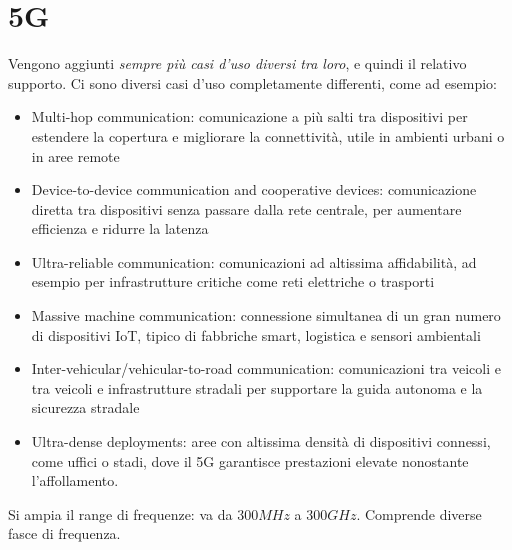 \section{5G}

Vengono aggiunti \textit{sempre più casi d'uso diversi tra loro}, e quindi il relativo supporto. Ci sono diversi casi d'uso completamente differenti, come ad esempio:
\begin{itemize}
	\item Multi-hop communication: comunicazione a più salti tra dispositivi per estendere la copertura e migliorare la connettività, utile in ambienti urbani o in aree remote
	\item Device-to-device communication and cooperative devices: comunicazione diretta tra dispositivi senza passare dalla rete centrale, per aumentare efficienza e ridurre la latenza	
	\item Ultra-reliable communication: comunicazioni ad altissima affidabilità, ad esempio per infrastrutture critiche come reti elettriche o trasporti
	\item Massive machine communication: connessione simultanea di un gran numero di dispositivi IoT, tipico di fabbriche smart, logistica e sensori ambientali	
	\item Inter-vehicular/vehicular-to-road communication: comunicazioni tra veicoli e tra veicoli e infrastrutture stradali per supportare la guida autonoma e la sicurezza stradale
	\item Ultra-dense deployments: aree con altissima densità di dispositivi connessi, come uffici o stadi, dove il 5G garantisce prestazioni elevate nonostante l'affollamento.
\end{itemize}
Si ampia il range di frequenze: va da $300MHz$ a $300GHz$. Comprende diverse fasce di frequenza.\\

\newpage

